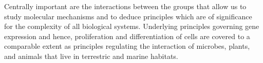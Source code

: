 Centrally important are the interactions between the groups that allow us to study molecular mechanisms and to deduce principles which are of significance for the complexity of all biological systems. Underlying principles governing gene expression and hence, proliferation and differentiation of cells are covered to a comparable extent as principles regulating the interaction of microbes, plants, and animals that live in terrestric and marine habitats.\\
